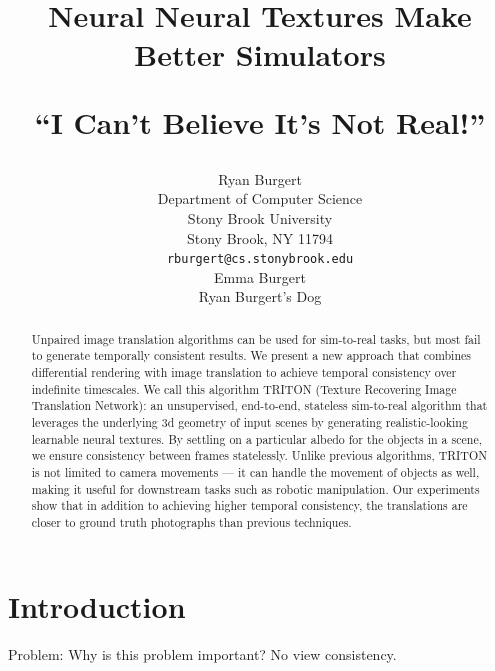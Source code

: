 \documentclass{article}
\title{Neural Neural Textures Make Better Simulators

``I Can't Believe It's Not Real!''%
 }
\author{%
	Ryan Burgert \\
	Department of Computer Science\\
	Stony Brook University\\
	Stony Brook, NY 11794 \\
	\texttt{rburgert@cs.stonybrook.edu} \\
	\And
	Emma Burgert \\
	Ryan Burgert's Dog\\
}
\begin{document}
\maketitle


\begin{abstract}
	Unpaired image translation algorithms can be used for sim-to-real tasks, but most fail to generate temporally consistent results.
	We present a new approach that combines differential rendering with image translation to achieve temporal consistency over indefinite timescales.
%
	We call this algorithm TRITON (Texture Recovering Image Translation Network): an unsupervised, end-to-end, stateless sim-to-real algorithm that 
	leverages the underlying 3d geometry of input scenes by generating realistic-looking learnable neural textures.
%
	By settling on a particular albedo for the objects in a scene, we ensure consistency between frames statelessly.
	Unlike previous algorithms, TRITON is not limited to camera movements --- it can handle the movement of objects as well, making it useful for downstream tasks such as robotic manipulation.
	Our experiments show that in addition to achieving higher temporal consistency, the translations are closer to ground truth photographs than previous techniques.
\end{abstract}

\section{Introduction}
Problem: 
Why is this problem important?
No view consistency.
\end{document}
